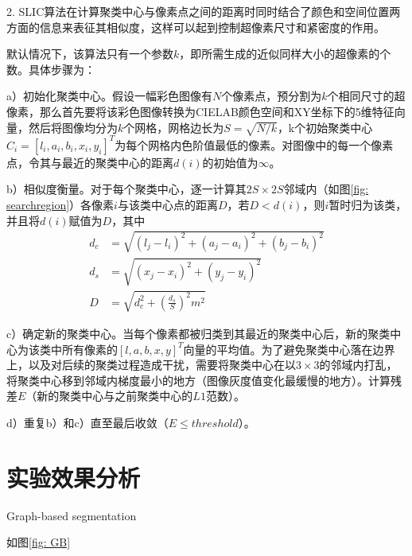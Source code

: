 \documentclass[12pt]{article}
\begin{document}
2. SLIC算法在计算聚类中心与像素点之间的距离时同时结合了颜色和空间位置两方面的信息来表征其相似度，这样可以起到控制超像素尺寸和紧密度的作用。

默认情况下，该算法只有一个参数$k$，即所需生成的近似同样大小的超像素的个数。具体步骤为：

a）初始化聚类中心。假设一幅彩色图像有$N$个像素点，预分割为$k$个相同尺寸的超像素，那么首先要将该彩色图像转换为CIELAB颜色空间和XY坐标下的5维特征向量，然后将图像均分为$k$个网格，网格边长为$S=\sqrt{N/k}$，k个初始聚类中心$C_i=[l_i, a_i, b_i, x_i, y_i]^T$为每个网格内色阶值最低的像素。对图像中的每一个像素点，令其与最近的聚类中心的距离$d(i)$的初始值为$\infty$。

b）相似度衡量。对于每个聚类中心，逐一计算其$2S \times 2S$邻域内（如图\ref{fig: searchregion}）各像素$i$与该类中心点的距离$D$，若$D<d(i)$，则$i$暂时归为该类，并且将$d(i)$赋值为$D$，其中
\begin{align}
d_c & =  \sqrt{(l_j-l_i)^2+(a_j-a_i)^2+(b_j-b_i)^2}\\
d_s & =  \sqrt{(x_j-x_i)^2+(y_j-y_i)^2}\\
D & =  \sqrt{d_c^2+\left(\frac{d_s}{S}\right)^2m^2}
\end{align}

c）确定新的聚类中心。当每个像素都被归类到其最近的聚类中心后，新的聚类中心为该类中所有像素的$[l, a, b, x, y]^T$向量的平均值。为了避免聚类中心落在边界上，以及对后续的聚类过程造成干扰，需要将聚类中心在以$3\times3$的邻域内打乱，将聚类中心移到邻域内梯度最小的地方（图像灰度值变化最缓慢的地方）。计算残差$E$（新的聚类中心与之前聚类中心的$L1$范数）。

d）重复b）和c）直至最后收敛（$E\le threshold$）。

\section{实验效果分析}

Graph-based segmentation

如图\ref{fig: GB}
\end{document}
